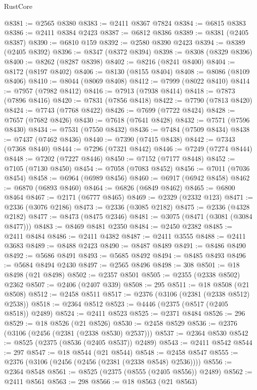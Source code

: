 \begin{lexlean}{RustCore}
\begin{coremodule}
@8381 := @2565 @8380
@8383 := @2411 @8367 @7824
@8384 := @6815 @8383
@8386 := @2411 @8384 @2423
@8387 := @6812 @8386
@8389 := @8381 (@2405 @8387)
@8390 := @6810 @159
@8392 := @2580 @8390 @2423
@8394 := @8389 (@2405 @8392)
@8396 := @8347 (@8372 @8394)
@8398 := @8308 (@8329 @8396)
@8400 := @8262 (@8287 @8398)
@8402 := @8216 (@8241 @8400)
@8404 := @8172 (@8197 @8402)
@8406 := @8130 (@8155 @8404)
@8408 := @8086 (@8109 @8406)
@8410 := @8044 (@8069 @8408)
@8412 := @7999 (@8022 @8410)
@8414 := @7957 (@7982 @8412)
@8416 := @7913 (@7938 @8414)
@8418 := @7873 (@7896 @8416)
@8420 := @7831 (@7856 @8418)
@8422 := @7790 (@7813 @8420)
@8424 := @7743 (@7768 @8422)
@8426 := @7699 (@7722 @8424)
@8428 := @7657 (@7682 @8426)
@8430 := @7618 (@7641 @8428)
@8432 := @7571 (@7596 @8430)
@8434 := @7531 (@7550 @8432)
@8436 := @7484 (@7509 @8434)
@8438 := @7437 (@7462 @8436)
@8440 := @7390 (@7415 @8438)
@8442 := @7343 (@7368 @8440)
@8444 := @7296 (@7321 @8442)
@8446 := @7249 (@7274 @8444)
@8448 := @7202 (@7227 @8446)
@8450 := @7152 (@7177 @8448)
@8452 := @7105 (@7130 @8450)
@8454 := @7058 (@7083 @8452)
@8456 := @7011 (@7036 @8454)
@8458 := @6964 (@6989 @8456)
@8460 := @6917 (@6942 @8458)
@8462 := @6870 (@6893 @8460)
@8464 := @6826 (@6849 @8462)
@8465 := @6800 @8464
@8467 := @2171 (@6777 @8465)
@8469 := @2329 (@2332 @123)
@8471 := @2336 (@3076 @2186)
@8473 := @2336 (@3085 @2182)
@8475 := @2336 (@4328 @2182)
@8477 := @8473 (@8475 @2346)
@8481 := @3075 (@8471 (@3081 (@3084 @8477)))
@8483 := @8469 @8481 @2350
@8484 := @2450 @2382
@8485 := @2411 @8484
@8486 := @2411 @4382
@8487 := @2411 @3555
@8488 := @2411 @3683
@8489 := @8488 @2423
@8490 := @8487 @8489
@8491 := @8486 @8490
@8492 := @5686 @8491
@8493 := @5685 @8492
@8494 := @8485 @8493
@8496 := @5684 @8494 @2430
@8497 := @2565 @8496
@8498 := 308
@8501 := @18 @8498 (@21 @8498)
@8502 := @2357 @8501
@8505 := @2355 (@2338 @8502) @2362
@8507 := @2406 (@2407 @339)
@8508 := 295
@8511 := @18 @8508 (@21 @8508)
@8512 := @2458 @8511
@8517 := @2376 (@3106 (@2381 (@2338 @8512) @2538))
@8518 := @2364 @8512
@8523 := @4446 (@2375 (@8517 (@2405 @8518)) @2489)
@8524 := @2411 @8523
@8525 := @2371 @8484
@8526 := 296
@8529 := @18 @8526 (@21 @8526)
@8530 := @2458 @8529
@8536 := @2376 (@3106 (@2456 (@2381 (@2338 @8530) @2537)))
@8537 := @2364 @8530
@8542 := @8525 (@2375 (@8536 (@2405 @8537)) @2489)
@8543 := @2411 @8542
@8544 := 297
@8547 := @18 @8544 (@21 @8544)
@8548 := @2458 @8547
@8555 := @2376 (@3106 (@2456 (@2456 (@2381 (@2338 @8548) @2536))))
@8556 := @2364 @8548
@8561 := @8525 (@2375 (@8555 (@2405 @8556)) @2489)
@8562 := @2411 @8561
@8563 := 298
@8566 := @18 @8563 (@21 @8563)

\end{coremodule}
\end{lexlean}
